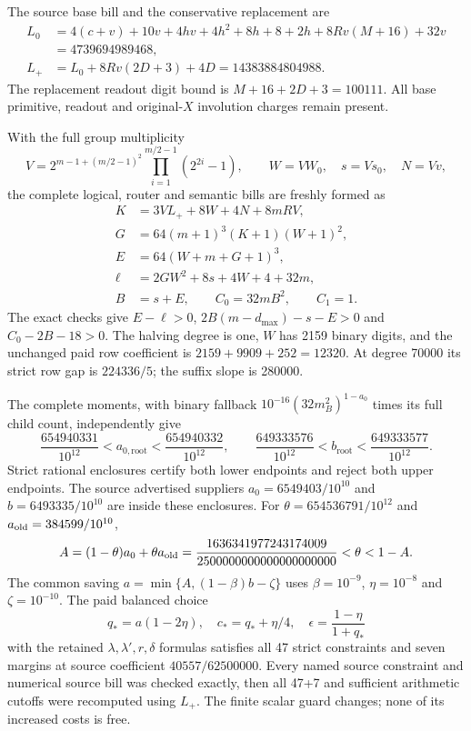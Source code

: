 \documentclass{article}
\begin{document}
The source base bill and the conservative replacement are
\begin{align*}
 L_0&=4(c+v)+10v+4hv+4h^2+8h+8+2h+8Rv(M+16)+32v\\
    &=4739694989468,\\
 L_+&=L_0+8Rv(2D+3)+4D=14383884804988.
\end{align*}
The replacement readout digit bound is $M+16+2D+3=100111$. All base
primitive, readout and original-$X$ involution charges remain present.

With the full group multiplicity
\[
 V=2^{m-1+(m/2-1)^2}\prod_{i=1}^{m/2-1}(2^{2i}-1),
 \qquad W=VW_0,\quad s=Vs_0,\quad N=Vv,
\]
the complete logical, router and semantic bills are freshly formed as
\begin{align*}
 K&=3VL_++8W+4N+8mRV,\\
 G&=64(m+1)^3(K+1)(W+1)^2,\\
 E&=64(W+m+G+1)^3,\\
 \ell&=2GW^2+8s+4W+4+32m,\\
 B&=s+E,\qquad C_0=32mB^2,\qquad C_1=1.
\end{align*}
The exact checks give $E-\ell>0$, $2B(m-d_{\max})-s-E>0$ and
$C_0-2B-18>0$. The halving degree is one, $W$ has 2159 binary digits,
and the unchanged paid row coefficient is $2159+9909+252=12320$.
At degree 70000 its strict row gap is $224336/5$; the suffix slope is 280000.

The complete moments, with binary fallback
$10^{-16}(32m_B^2)^{1-a_0}$ times its full child count, independently give
\[
 \frac{654940331}{10^{12}}<a_{0,\mathrm{root}}<\frac{654940332}{10^{12}},
 \qquad
 \frac{649333576}{10^{12}}<b_{\mathrm{root}}<\frac{649333577}{10^{12}}.
\]
Strict rational enclosures certify both lower endpoints and reject both upper
endpoints. The source advertised suppliers
$a_0=6549403/10^{10}$ and $b=6493335/10^{10}$ are inside these enclosures.
For $\theta=654536791/10^{12}$ and $a_{\rm old}=384599/10^{10}$,
\[
 A=(1-\theta)a_0+\theta a_{\rm old}
  =\frac{1636341977243174009}{2500000000000000000000}<\theta<1-A.
\]
The common saving $a=\min\{A,(1-\beta)b-\zeta\}$ uses
$\beta=10^{-9}$, $\eta=10^{-8}$ and $\zeta=10^{-10}$.
The paid balanced choice
\[
 q_*=a(1-2\eta),\quad c_*=q_*+\eta/4,\quad
 \epsilon=\frac{1-\eta}{1+q_*}
\]
with the retained $\lambda,\lambda',r,\delta$ formulas satisfies all 47
strict constraints and seven margins at source coefficient $40557/62500000$.
Every named source constraint and numerical source bill was checked exactly,
then all 47+7 and sufficient arithmetic cutoffs were recomputed using $L_+$.
The finite scalar guard changes; none of its increased costs is free.
\end{document}
